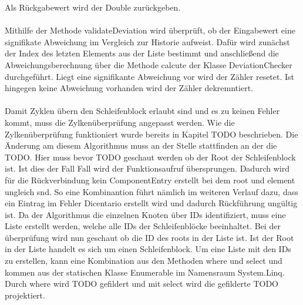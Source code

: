 \documentclass{article}
\begin{document}
    Als Rückgabewert wird der Double zurückgeben.\\
    \\
    Mithilfe der Methode validateDeviation wird überprüft, ob der Eingabewert eine signifikate Abweichung im Vergleich zur Historie aufweist.
    Dafür wird zunächst der Index des letzten Elements aus der Liste bestimmt und anschließend die Abweichungsberechnung über die Methode calcute der Klasse DeviationChecker durchgeführt.
    Liegt eine signifikante Abweichung vor wird der Zähler resetet. Ist hingegen keine Abweichung vorhanden wird der Zähler dekremntiert.\\
    \\
    Damit Zyklen übern den Schleifenblock erlaubt sind und es zu keinen Fehler kommt, muss die Zylkenüberprüfung angepasst werden.
    Wie die Zylkenüberprüfung funktioniert wurde bereits in Kapitel TODO beschrieben.
    Die Änderung am diesem Algorithmus muss an der Stelle stattfinden an der die TODO.
    Hier muss bevor TODO geschaut werden ob der Root der Schleifenblock ist.
    Ist dies der Fall Fall wird der Funktionsaufruf übersprungen.
    Dadurch wird für die Rückverbindung kein ComponentEntry erstellt bei dem root und element ungleich snd. 
    So eine Kombinantion führt nämlich im weiteren Verlauf dazu, dass ein Eintrag im Fehler Dicentario erstellt wird und dadurch Rückführung ungültig ist.    
    Da der Algorithmus die einzelnen Knoten über IDs identifiziert, muss eine Liste erstellt werden, welche alle IDs der Schleifenblöcke beeinhaltet. 
    Bei der überprüfung wird nun geschaut ob die ID des roots in der Liste ist. 
    Ist der Root in der Liste handelt es sich um einen Schleifenblock. 
    Um eine Liste mit den IDs zu erstellen, kann eine Kombination aus den Methoden where und select und kommen aus der statischen Klasse Enumerable im Namensraum System.Linq. 
    Durch where wird TODO gefildert und mit select wird die gefilderte TODO projektiert.
\end{document}
